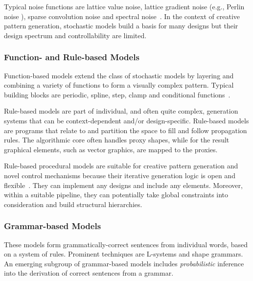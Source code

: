 Typical noise functions are lattice value noise, lattice gradient noise (e.g., Perlin noise \cite{perlin_1985_ais}), sparse convolution noise and spectral noise~\cite{ebert_2003_tmp,lagae_2010_sap}. 
In the context of creative pattern generation, stochastic models build a basis for many designs but their design spectrum and controllability are limited.

\subsubsection{Function- and Rule-based Models} 

Function-based models extend the class of stochastic models by layering and combining a variety of functions to form a visually complex pattern. Typical building blocks are periodic, spline, step, clamp and conditional functions~\cite{ebert_2003_tmp}. 

Rule-based models are part of individual, and often quite complex, generation systems that can be context-dependent and/or design-specific. Rule-based models are programs that relate to and partition the space to fill and follow propagation rules. The algorithmic core often handles proxy shapes, while for the result graphical elements, such as vector graphics, are mapped to the proxies.
    
Rule-based procedural models are suitable for creative pattern generation and novel control mechanisms because their iterative generation logic is open and flexible~\cite{wong_1998_cgf, mech_2012_tdf}. They can implement any designs and include any elements. Moreover, within a suitable pipeline, they can potentially take global constraints into consideration and build structural hierarchies.

\subsubsection{Grammar-based Models}

These models form grammatically-correct sentences from individual words, based on a system of rules. 
Prominent techniques are L-systems and shape grammars. An emerging subgroup of grammar-based models includes \textit{probabilistic} inference into the derivation of correct sentences from a grammar.

